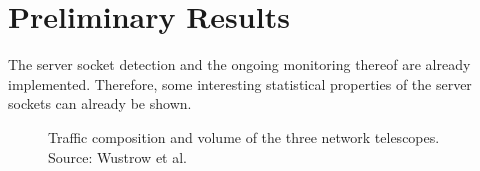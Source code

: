 \documentclass{sigcomm-alternate}
\begin{document}
\section{Preliminary Results}

The server socket detection and the ongoing monitoring thereof are already implemented. Therefore, some interesting statistical properties of the server sockets can already be shown.
\begin{figure*}[h!]
\centering
\caption{Traffic composition and volume of the three network telescopes. Source: Wustrow et al.}
\label{fig:Wustrow_spatial}
\end{figure*}
 
% 

\end{document}
